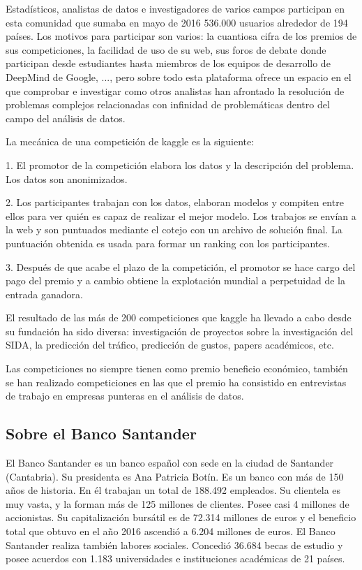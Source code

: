 \documentclass[11pt,a4paper,spanish]{article} %
\begin{document}
Estadísticos, analistas de datos e investigadores de varios campos participan en esta comunidad que sumaba en mayo de 2016 536.000 usuarios alrededor de 194 países. Los motivos para participar son varios: la cuantiosa cifra de los premios de sus competiciones, la facilidad de uso de su web, sus foros de debate donde participan desde estudiantes hasta miembros de los equipos de desarrollo de DeepMind de Google, ..., pero sobre todo esta plataforma ofrece un espacio en el que comprobar e investigar como otros analistas han afrontado la resolución de problemas complejos relacionadas con infinidad de problemáticas dentro del campo del análisis de datos.

La mecánica de una competición de kaggle es la siguiente:

1. El promotor de la competición elabora los datos y la descripción del problema. Los datos son anonimizados.

2. Los participantes trabajan con los datos, elaboran modelos y compiten entre ellos para ver quién es capaz de realizar el mejor modelo. Los trabajos se envían a la web y son puntuados mediante el cotejo con un archivo de solución final. La puntuación obtenida es usada para formar un ranking con los participantes.

3. Después de que acabe el plazo de la competición, el promotor se hace cargo del pago del premio y a cambio obtiene la explotación mundial a perpetuidad de la entrada ganadora. 

El resultado de las más de 200 competiciones que kaggle ha llevado a cabo desde su fundación ha sido diversa: investigación de proyectos sobre la investigación del SIDA, la predicción del tráfico, predicción de gustos, papers académicos, etc. 

Las competiciones no siempre tienen como premio beneficio económico, también se han realizado competiciones en las que el premio ha consistido en entrevistas de trabajo en empresas punteras en el análisis de datos.

 

\subsection{Sobre el Banco Santander}
El Banco Santander es un banco español con sede en la ciudad de Santander (Cantabria). Su presidenta es Ana Patricia Botín. Es un banco con más de 150 años de historia. En él trabajan un total de 188.492 empleados. Su clientela es muy vasta, y la forman más de 125 millones de clientes. Posee casi 4 millones de accionistas. Su capitalización bursátil es de 72.314 millones de euros y el beneficio total que obtuvo en el año 2016 ascendió a 6.204 millones de euros. El Banco Santander realiza también labores sociales. Concedió 36.684 becas de estudio y posee acuerdos con 1.183 universidades e instituciones académicas de 21 países. 
\end{document}
